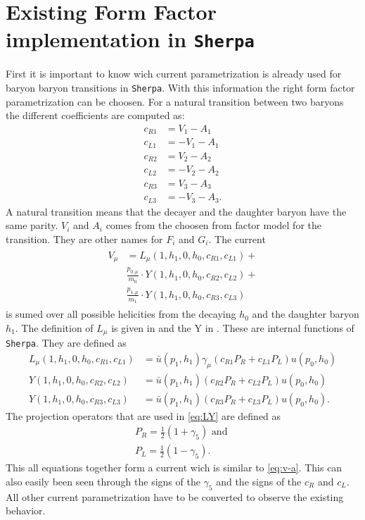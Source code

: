 \section{Existing Form Factor implementation in \texttt{Sherpa}}
First it is important to know wich current parametrization is already used 
for baryon baryon transitions in \texttt{Sherpa}. With this information 
the right form factor parametrization can be choosen.
For a natural transition between two baryons the different coefficients 
are computed as:
\begin{align}
  c_{R1} & = V_1 - A_1 \nonumber \\
  c_{L1} & = -V_1 - A_1 \nonumber \\
  c_{R2} & = V_2 - A_2 \nonumber \\
  c_{L2} & = -V_2 - A_2 \nonumber \\
  c_{R3} & = V_3 - A_3 \nonumber \\
  c_{L3} & = -V_3 - A_3. \label{eq:c-coeff}
\end{align}
A natural transition means that the decayer and the daughter baryon have the same parity.
\(V_i\) and \(A_i\) comes from the choosen from factor model for the transition. 
They are other names for \(F_i\) and \(G_i\).
The current 
\begin{align}
\begin{split}
  V_\mu &= L_\mu(1, h_1, 0, h_0, c_{R1}, c_{L1}) + \\
        & \frac{p_{0, \mu}}{m_0} \cdot Y(1, h_1, 0, h_0, c_{R2}, c_{L2}) + \\
        & \frac{p_{1, \mu}}{m_1} \cdot Y(1, h_1, 0, h_0, c_{R3}, c_{L3}) \label{eq:b-curr}
\end{split}
\end{align}
is sumed over all possible helicities from the decaying \(h_0\) and the daughter baryon \(h_1\).
The definition of \(L_\mu\) is given in \cite[Eq. A.96]{diploma} and the Y in 
\cite[Eq. A.94]{diploma}. These are internal functions of \texttt{Sherpa}. 
They are defined as
\begin{align}
  L_\mu(1, h_1, 0, h_0, c_{R1}, c_{L1}) & = \bar{u}(p_1, h_1)\gamma_\mu \left( c_{R1} P_R + c_{L1} P_L \right) u(p_0, h_0) \nonumber \\
  Y(1, h_1, 0, h_0, c_{R2}, c_{L2}) & = \bar{u}(p_1, h_1) \left( c_{R2} P_R + c_{L2} P_L \right) u(p_0, h_0) \nonumber \\
  Y(1, h_1, 0, h_0, c_{R3}, c_{L3}) & = \bar{u}(p_1, h_1) \left( c_{R3} P_R + c_{L3} P_L \right) u(p_0, h_0). \label{eq:LY}
\end{align}
The projection operators that are used in {\eqref{eq:LY}} are defined as
\begin{align}
  P_R = \frac{1}{2} \left( 1 + \gamma_5 \right) \nonumber \text{ and }\\
  P_L = \frac{1}{2} \left( 1 - \gamma_5 \right). \label{eq:proj}
\end{align}
This all equations together form a current wich is similar to {\eqref{eq:v-a}}.
This can also easily been seen through the signs of the \(\gamma_5\) and the 
signs of the \(c_R\) and \(c_L\).
All other current parametrization have to be converted to observe the 
existing behavior.

